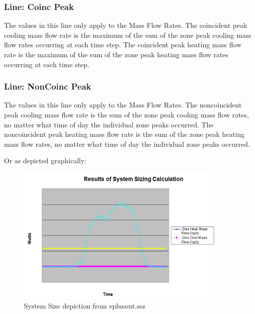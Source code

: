\subsubsection{Line: Coinc Peak}\label{line-coinc-peak}

The values in this line only apply to the Mass Flow Rates. The coincident peak cooling mass flow rate is the maximum of the sum of the zone peak cooling mass flow rates occurring at each time step. The coincident peak heating mass flow rate is the maximum of the sum of the zone peak heating mass flow rates occurring at each time step.

\subsubsection{Line: NonCoinc Peak}\label{line-noncoinc-peak}

The values in this line only apply to the Mass Flow Rates. The noncoincident peak cooling mass flow rate is the sum of the zone peak cooling mass flow rates, no matter what time of day the individual zone peaks occurred. The noncoincident peak heating mass flow rate is the sum of the zone peak heating mass flow rates, no matter what time of day the individual zone peaks occurred.

Or as depicted graphically:

\begin{figure}[hbtp] %
\centering
\includegraphics[width=0.9\textwidth, height=0.9\textheight, keepaspectratio=true]{media/image017.png}
\caption{System Size depiction from eplusout.ssz \protect \label{fig:system-size-depiction-from-eplusout.ssz}}
\end{figure}
